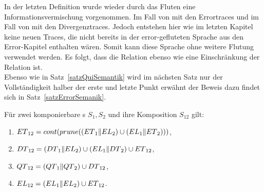 In der letzten Definition wurde wieder durch das Fluten eine
Informationsvermischung vorgenommen. Im Fall von \DT{} mit den Errortraces und
im Fall von \QT{} mit den Divergenztraces. Jedoch entstehen hier wie im letzten
Kapitel keine neuen Traces, die nicht bereits in der error-gefluteten Sprache
\EL{} aus den Error-Kapitel enthalten wären. Somit kann diese Sprache ohne
weitere Flutung verwendet werden. Es folgt, dass die Relation \DRel{} ebenso
wie \QRel{} eine Einschränkung der Relation \ERel{} ist.\\
Ebenso wie in Satz~\ref{satzQuiSemantik} wird im nächsten Satz nur der
Vollständigkeit halber der erste und letzte Punkt erwähnt der Beweis dazu
findet sich in Satz~\ref{satzErrorSemanik}.

\begin{satz}
\label{satzDivSemantik}
  Für zwei komponierbare \EIO{}s $S_1, S_2$ und ihre Komposition
  $S_{12}$ gilt:
  \begin{enumerate}
    \item $ET{}_{12}=cont (prune ((ET{}_1\|EL{}_2)\cup
      (EL{}_1\|ET{}_2)))$,
    \item $DT{}_{12}= (DT{}_1\|EL{}_2)\cup (EL{}_1\|DT{}_2)\cup
      ET{}_{12}$,%
    \item $QT{}_{12}=(QT{}_1\|QT{}_2)\cup DT{}_{12}$,
    \item $EL{}_{12}=(EL{}_1\|EL{}_2)\cup ET{}_{12}$.
  \end{enumerate}
\end{satz}

